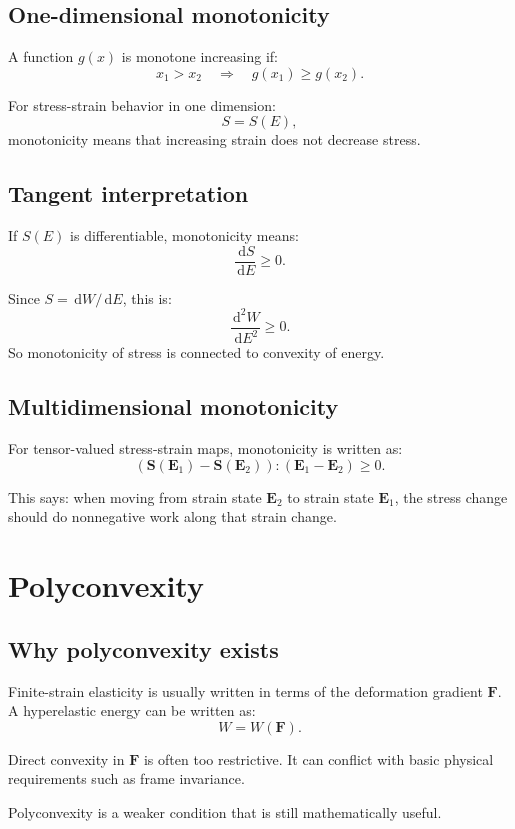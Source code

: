 \documentclass[11pt]{article}
\newcommand{\E}{\bm{E}}
\newcommand{\F}{\bm{F}}
\newcommand{\Sstress}{\bm{S}}
\newcommand{\dd}{\,\mathrm{d}}
\begin{document}
\subsection{One-dimensional monotonicity}

A function $g(x)$ is monotone increasing if:
\[
  x_1 > x_2
  \quad \Rightarrow \quad
  g(x_1) \ge g(x_2).
\]

For stress-strain behavior in one dimension:
\[
  S = S(E),
\]
monotonicity means that increasing strain does not decrease stress.

\subsection{Tangent interpretation}

If $S(E)$ is differentiable, monotonicity means:
\[
  \frac{\dd S}{\dd E} \ge 0.
\]

Since $S=\dd W/\dd E$, this is:
\[
  \frac{\dd^2 W}{\dd E^2} \ge 0.
\]
So monotonicity of stress is connected to convexity of energy.

\subsection{Multidimensional monotonicity}

For tensor-valued stress-strain maps, monotonicity is written as:
\[
  \left(
    \Sstress(\E_1)-\Sstress(\E_2)
  \right)
  :
  \left(
    \E_1-\E_2
  \right)
  \ge 0.
\]

This says: when moving from strain state $\E_2$ to strain state $\E_1$, the
stress change should do nonnegative work along that strain change.

\section{Polyconvexity}

\subsection{Why polyconvexity exists}

Finite-strain elasticity is usually written in terms of the deformation gradient
$\F$. A hyperelastic energy can be written as:
\[
  W = W(\F).
\]

Direct convexity in $\F$ is often too restrictive. It can conflict with basic
physical requirements such as frame invariance.

Polyconvexity is a weaker condition that is still mathematically useful.
\end{document}
